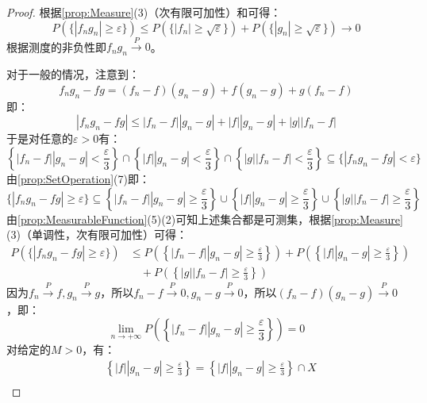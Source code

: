 \begin{proof}
	根据\cref{prop:Measure}(3)（次有限可加性）和可得：
	\begin{equation*}
		P(\{|f_ng_n|\geqslant\varepsilon\})\leqslant P(\{|f_n|\geqslant\sqrt{\varepsilon}\})+P(\{|g_n|\geqslant\sqrt{\varepsilon}\})\to0
	\end{equation*}
	根据测度的非负性即$f_ng_n\overset{P}{\longrightarrow}0$。\par
	对于一般的情况，注意到：
	\begin{equation*}
		f_ng_n-fg=(f_n-f)(g_n-g)+f(g_n-g)+g(f_n-f)
	\end{equation*}
	即：
	\begin{equation*}
		|f_ng_n-fg|\leqslant|f_n-f||g_n-g|+|f||g_n-g|+|g||f_n-f|
	\end{equation*}
	于是对任意的$\varepsilon>0$有：
	\begin{equation*}
		\left\{|f_n-f||g_n-g|<\frac{\varepsilon}{3}\right\}\cap\left\{|f||g_n-g|<\frac{\varepsilon}{3}\right\}\cap\left\{|g||f_n-f|<\frac{\varepsilon}{3}\right\}\subseteq\{|f_ng_n-fg|<\varepsilon\}
	\end{equation*}
	由\cref{prop:SetOperation}(7)即：
	\begin{equation*}
		\{|f_ng_n-fg|\geqslant\varepsilon\}\subseteq\left\{|f_n-f||g_n-g|\geqslant\frac{\varepsilon}{3}\right\}\cup\left\{|f||g_n-g|\geqslant\frac{\varepsilon}{3}\right\}\cup\left\{|g||f_n-f|\geqslant\frac{\varepsilon}{3}\right\}
	\end{equation*}
	由\cref{prop:MeasurableFunction}(5)(2)可知上述集合都是可测集，根据\cref{prop:Measure}(3)（单调性，次有限可加性）可得：
	\begin{align*}
		P(\{|f_ng_n-fg|\geqslant\varepsilon\})&\leqslant P\left(\left\{|f_n-f||g_n-g|\geqslant\frac{\varepsilon}{3}\right\}\right)+P\left(\left\{|f||g_n-g|\geqslant\frac{\varepsilon}{3}\right\}\right) \\
		&\quad+P\left(\left\{|g||f_n-f|\geqslant\frac{\varepsilon}{3}\right\}
		\right)
	\end{align*}
	因为$f_n\overset{P}{\longrightarrow}f,g_n\overset{P}{\longrightarrow}g$，所以$f_n-f\overset{P}{\longrightarrow}0,g_n-g\overset{P}{\longrightarrow}0$，所以$(f_n-f)(g_n-g)\overset{P}{\longrightarrow}0$，即：
	\begin{equation*}
		\lim_{n\to+\infty}P\left(\left\{|f_n-f||g_n-g|\geqslant\frac{\varepsilon}{3}\right\}\right)=0
	\end{equation*}
	对给定的$M>0$，有：
	\begin{align*}
		&\left\{|f||g_n-g|\geqslant\frac{\varepsilon}{3}\right\}=\left\{|f||g_n-g|\geqslant\frac{\varepsilon}{3}\right\}\cap X \\

\end{align*}
\end{proof}
